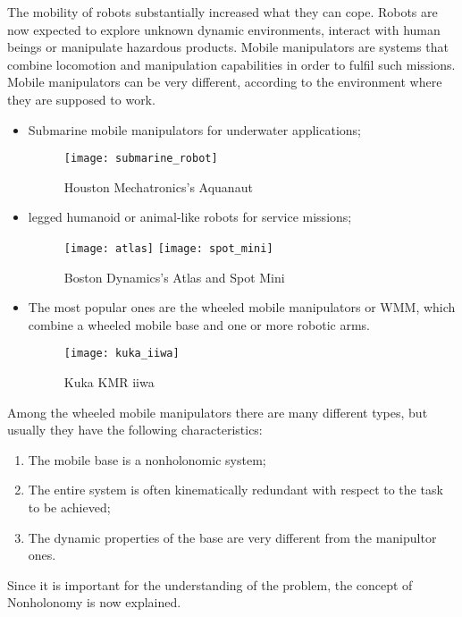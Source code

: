 The mobility of robots substantially increased what they can cope. Robots are now expected to explore unknown dynamic environments, interact with human beings or manipulate hazardous products. Mobile manipulators are systems that combine locomotion and manipulation capabilities in order to fulfil such missions. \\
Mobile manipulators can be very different, according to the environment where they are supposed to work.
\begin{itemize}
	\item Submarine mobile manipulators for underwater applications;
	\begin{figure}[h!]
		\centering
		\texttt{[image: submarine\_robot]}
		\caption{Houston Mechatronics's Aquanaut}
		\label{fig:aquanaut} 
	\end{figure}
	\item legged humanoid or animal-like robots for service missions;
	\begin{figure}[h!]
		\centering 
		\texttt{[image: atlas]}
		\label{fig:atlas} 
		\quad
		\texttt{[image: spot\_mini]}
		\label{fig:spotmini} 
		\caption{Boston Dynamics's Atlas and Spot Mini}
	\end{figure}
	\item The most popular ones are the wheeled mobile manipulators or WMM, which combine a wheeled mobile base and one or more robotic arms.
	\begin{figure}[h!]
		\centering
		\texttt{[image: kuka\_iiwa]}
		\caption{Kuka KMR iiwa}
		\label{fig:iiwa} 
	\end{figure}
\end{itemize}
Among the wheeled mobile manipulators there are many different types, but usually they have the following characteristics:
\begin{enumerate}
	\item The mobile base is a nonholonomic system;
	\item The entire system is often kinematically redundant with respect to the task to be achieved;
	\item The dynamic properties of the base are very different from the manipultor ones.
\end{enumerate}
Since it is important for the understanding of the problem, the concept of Nonholonomy is now explained.

